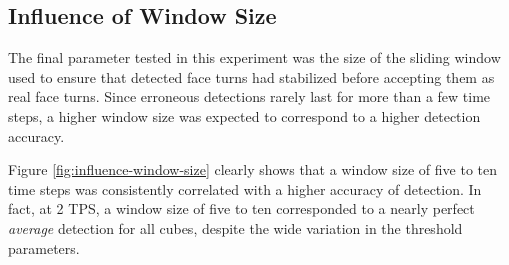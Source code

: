 \subsection{Influence of Window Size}
\label{subsec:influence-window-size}

The final parameter tested in this experiment was the size of the
sliding window used to ensure that detected face turns had stabilized
before accepting them as real face turns. Since erroneous detections
rarely last for more than a few time steps, a higher window size was
expected to correspond to a higher detection accuracy.

Figure \ref{fig:influence-window-size} clearly shows that a window size
of five to ten time steps was consistently correlated with a higher
accuracy of detection. In fact, at 2 TPS, a window size of five to ten
corresponded to a nearly perfect \emph{average} detection for all cubes, despite the wide variation in the threshold parameters.





